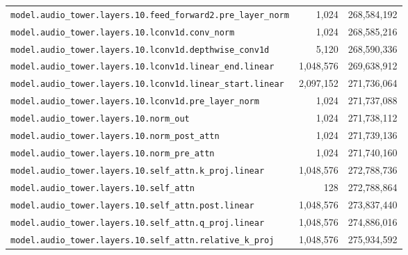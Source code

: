 \documentclass[10pt,a4paper]{article}
\theoremstyle{definition}
\begin{document}
\begin{appendices}
\begin{longtable}{p{9.5cm}rr}
\texttt{model.\allowbreak{}audio\_tower.\allowbreak{}layers.\allowbreak{}10.\allowbreak{}feed\_forward2.\allowbreak{}pre\_layer\_norm} & 1,024 & 268,584,192 \\
\texttt{model.\allowbreak{}audio\_tower.\allowbreak{}layers.\allowbreak{}10.\allowbreak{}lconv1d.\allowbreak{}conv\_norm} & 1,024 & 268,585,216 \\
\texttt{model.\allowbreak{}audio\_tower.\allowbreak{}layers.\allowbreak{}10.\allowbreak{}lconv1d.\allowbreak{}depthwise\_conv1d} & 5,120 & 268,590,336 \\
\texttt{model.\allowbreak{}audio\_tower.\allowbreak{}layers.\allowbreak{}10.\allowbreak{}lconv1d.\allowbreak{}linear\_end.\allowbreak{}linear} & 1,048,576 & 269,638,912 \\
\texttt{model.\allowbreak{}audio\_tower.\allowbreak{}layers.\allowbreak{}10.\allowbreak{}lconv1d.\allowbreak{}linear\_start.\allowbreak{}linear} & 2,097,152 & 271,736,064 \\
\texttt{model.\allowbreak{}audio\_tower.\allowbreak{}layers.\allowbreak{}10.\allowbreak{}lconv1d.\allowbreak{}pre\_layer\_norm} & 1,024 & 271,737,088 \\
\texttt{model.\allowbreak{}audio\_tower.\allowbreak{}layers.\allowbreak{}10.\allowbreak{}norm\_out} & 1,024 & 271,738,112 \\
\texttt{model.\allowbreak{}audio\_tower.\allowbreak{}layers.\allowbreak{}10.\allowbreak{}norm\_post\_attn} & 1,024 & 271,739,136 \\
\texttt{model.\allowbreak{}audio\_tower.\allowbreak{}layers.\allowbreak{}10.\allowbreak{}norm\_pre\_attn} & 1,024 & 271,740,160 \\
\texttt{model.\allowbreak{}audio\_tower.\allowbreak{}layers.\allowbreak{}10.\allowbreak{}self\_attn.\allowbreak{}k\_proj.\allowbreak{}linear} & 1,048,576 & 272,788,736 \\
\texttt{model.\allowbreak{}audio\_tower.\allowbreak{}layers.\allowbreak{}10.\allowbreak{}self\_attn} & 128 & 272,788,864 \\
\texttt{model.\allowbreak{}audio\_tower.\allowbreak{}layers.\allowbreak{}10.\allowbreak{}self\_attn.\allowbreak{}post.\allowbreak{}linear} & 1,048,576 & 273,837,440 \\
\texttt{model.\allowbreak{}audio\_tower.\allowbreak{}layers.\allowbreak{}10.\allowbreak{}self\_attn.\allowbreak{}q\_proj.\allowbreak{}linear} & 1,048,576 & 274,886,016 \\
\texttt{model.\allowbreak{}audio\_tower.\allowbreak{}layers.\allowbreak{}10.\allowbreak{}self\_attn.\allowbreak{}relative\_k\_proj} & 1,048,576 & 275,934,592 \\

\end{longtable}
\end{appendices}
\end{document}
